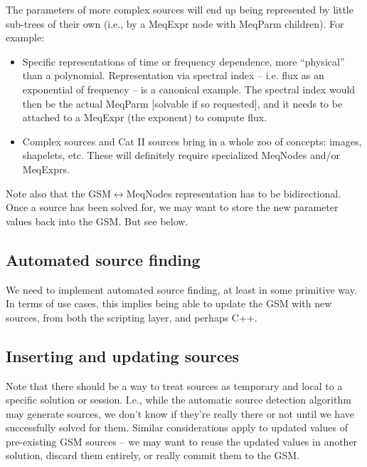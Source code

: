 \documentclass[]{lofar}
\begin{document}
  The parameters of more complex sources will end up being represented by
  little sub-trees of their own (i.e., by a MeqExpr node with MeqParm
  children). For example:

  \begin{itemize}
  
  \item Specific representations of time or frequency dependence, more
  ``physical'' than a polynomial. Representation via spectral index -- i.e.
  flux as an exponential of frequency -- is a canonical example. The spectral
  index would then be the actual MeqParm [solvable if so requested], and it
  needs to be attached to a MeqExpr (the exponent) to compute flux.

  \item Complex sources and Cat II sources bring in a whole zoo of concepts:
  images, shapelets, etc. These will definitely require specialized MeqNodes
  and/or MeqExprs. 

  \end{itemize}
  
  Note also that the GSM$\leftrightarrow$MeqNodes representation has to be
  bidirectional. Once a source has been solved for, we may want to store the
  new parameter values back into the GSM. But see below.

\subsection{Automated source finding}
  
  We need to implement automated source finding, at least in some primitive
  way.  In terms of use cases, this implies being able to update the GSM with
  new sources, from both the scripting layer, and perhaps C++. 

\subsection{Inserting and updating sources}
  
  Note that there should be a way to treat sources as temporary and local to a
  specific solution or session. I.e., while the automatic source detection
  algorithm may generate sources, we don't know if they're really there or not
  until we have successfully solved for them. Similar considerations apply to
  updated values of pre-existing GSM sources -- we may want to reuse the
  updated values in another solution, discard them entirely, or really commit
  them to the GSM.
\end{document}
